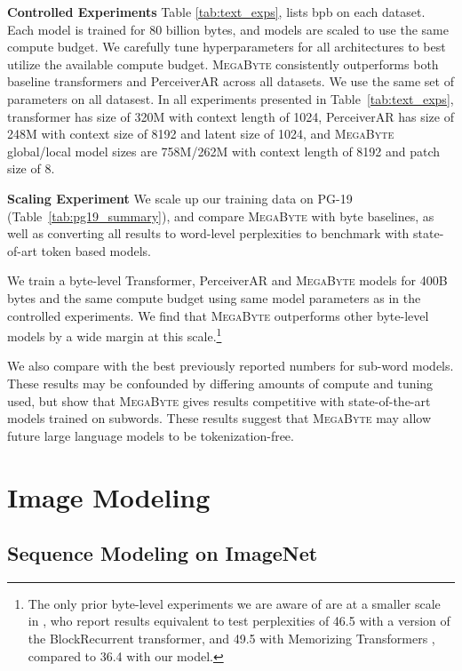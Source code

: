 \textbf{Controlled Experiments} Table \ref{tab:text_exps}, lists bpb on each dataset. Each model is trained for 80 billion bytes, and models are scaled to use the same compute budget. We carefully tune hyperparameters for all architectures to best utilize the available compute budget. \textsc{MegaByte} consistently outperforms both baseline transformers and PerceiverAR across all datasets. We use the same set of parameters on all datasest. In all experiments presented in Table~\ref{tab:text_exps}, transformer has size of 320M with context length of 1024, PerceiverAR has size of 248M with context size of 8192 and latent size of 1024, and \textsc{MegaByte} global/local model sizes are 758M/262M with context length of 8192 and patch size of 8. 

\label{sec:results}

\textbf{Scaling Experiment} We scale up our training data on PG-19 (Table~\ref{tab:pg19_summary}), and compare \textsc{MegaByte} with byte baselines, as well as converting all results to word-level perplexities to benchmark with state-of-art token based models. 

We train a byte-level Transformer, PerceiverAR and \textsc{MegaByte} models for 400B bytes and the same compute budget using same model parameters as in the controlled experiments. We find that \textsc{MegaByte} outperforms other byte-level models by a wide margin at this scale.\footnote{The only prior byte-level experiments we are aware of are at a smaller scale in \citet{blockrecurrent}, who report results equivalent to test perplexities of 46.5 with a version of the BlockRecurrent transformer, and 49.5 with Memorizing Transformers \cite{memorizing}, compared to 36.4 with our model. } 

We also compare with the best previously reported numbers for sub-word models. These results may be confounded by differing amounts of compute and tuning used, but show that \textsc{MegaByte} 
gives results competitive with state-of-the-art models trained on subwords. These results suggest that \textsc{MegaByte} may allow future large language models to be tokenization-free.

\section{Image Modeling}
\label{sec:image}

\subsection{Sequence Modeling on ImageNet}


